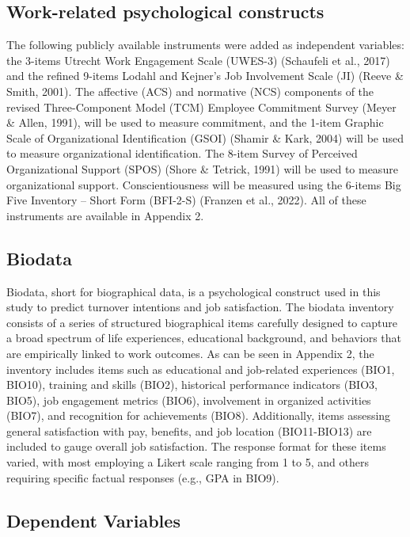 \documentclass[
  man]{apa7}
\begin{document}
\subsection{Work-related psychological constructs}\label{work-related-psychological-constructs}

The following publicly available instruments were added as independent variables: the 3-items Utrecht Work Engagement Scale (UWES-3) (Schaufeli et al., 2017) and the refined 9-items Lodahl and Kejner's Job Involvement Scale (JI) (Reeve \& Smith, 2001). The affective (ACS) and normative (NCS) components of the revised Three-Component Model (TCM) Employee Commitment Survey (Meyer \& Allen, 1991), will be used to measure commitment, and the 1-item Graphic Scale of Organizational Identification (GSOI) (Shamir \& Kark, 2004) will be used to measure organizational identification. The 8-item Survey of Perceived Organizational Support (SPOS) (Shore \& Tetrick, 1991) will be used to measure organizational support. Conscientiousness will be measured using the 6-items Big Five Inventory -- Short Form (BFI-2-S) (Franzen et al., 2022). All of these instruments are available in Appendix 2.

\subsection{Biodata}\label{biodata}

Biodata, short for biographical data, is a psychological construct used in this study to predict turnover intentions and job satisfaction. The biodata inventory consists of a series of structured biographical items carefully designed to capture a broad spectrum of life experiences, educational background, and behaviors that are empirically linked to work outcomes. As can be seen in Appendix 2, the inventory includes items such as educational and job-related experiences (BIO1, BIO10), training and skills (BIO2), historical performance indicators (BIO3, BIO5), job engagement metrics (BIO6), involvement in organized activities (BIO7), and recognition for achievements (BIO8). Additionally, items assessing general satisfaction with pay, benefits, and job location (BIO11-BIO13) are included to gauge overall job satisfaction. The response format for these items varied, with most employing a Likert scale ranging from 1 to 5, and others requiring specific factual responses (e.g., GPA in BIO9).

\subsection{Dependent Variables}\label{dependent-variables}
\end{document}
